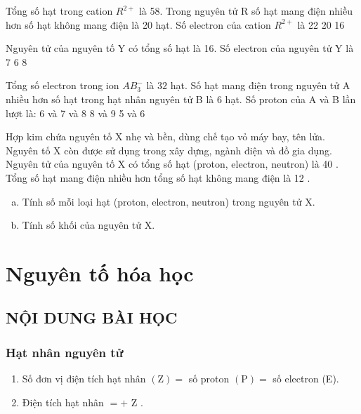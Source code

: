 \begin{ex}[2]
	Tổng số hạt trong cation $ R^{2+} $ là 58. Trong nguyên tử R số hạt mang điện nhiều hơn số hạt không mang điện là 20 hạt. Số electron của cation $ R^{2+} $ là
	\choice
	{%
	}
	{%
		22
	}
	{%
		20
	}
	{%
		16
	}
\end{ex}

\begin{ex}[2]
	Nguyên tử của nguyên tố Y có tổng số hạt là 16. Số electron của nguyên tử Y là
	\choice
	{%
		7
	}
	{%
		6
	}
	{%
	}
	{%
		8
	}
\end{ex}

\begin{ex}[3]
	Tổng số electron trong ion $ AB_{3}^{-} $ là $ 32 $ hạt. Số hạt mang điện trong nguyên tử A nhiều hơn số hạt trong hạt nhân nguyên tử B là 6 hạt. Số proton của A và B lần lượt là:
	\choice
	{%
		6 và 7
	}
	{%
		 và 8
	}
	{%
		8 và 9
	}
	{%
		5 và 6
	}
\end{ex}

\begin{bt}
	Hợp kim chứa nguyên tố $\mathrm{X}$ nhẹ và bền, dùng chế tạo vỏ máy bay, tên lửa. Nguyên tố $\mathrm{X}$ còn được sử dụng trong xây dựng, ngành điện và đồ gia dụng. Nguyên tử của nguyên tố $\mathrm{X}$ có tổng số hạt (proton, electron, neutron) là 40 . Tổng số hạt mang điện nhiều hơn tổng số hạt không mang điện là 12 .
	\begin{enumerate}[a)]
		\item Tính số mỗi loại hạt (proton, electron, neutron) trong nguyên tử $\mathrm{X}$.
		\item Tính số khối của nguyên tử $\mathrm{X}$.
	\end{enumerate}
\end{bt}
\newpage
\section{Nguyên tố hóa học}
\subsection{NỘI DUNG BÀI HỌC}
\subsubsection{Hạt nhân nguyên tử}
\begin{hoplythuyet}
	\begin{enumerate}
		\item Số đơn vị điện tích hạt nhân $(\mathrm{Z})=$ số proton $(\mathrm{P})=$ số electron (E).
		\item Điện tích hạt nhân $=+$ Z .
	\end{enumerate}
\end{hoplythuyet}

